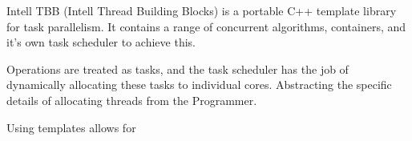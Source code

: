 Intell TBB (Intell Thread Building Blocks) is a portable C++ template library for task parallelism.
It contains a range of concurrent algorithms, containers, and it's own task scheduler to achieve this.

Operations are treated as tasks, and the task scheduler has the job of dynamically allocating these tasks 
to individual cores. Abstracting the specific details of allocating threads from the Programmer. 

Using templates allows for 

